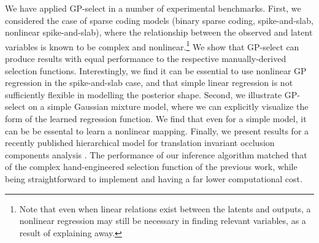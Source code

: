 We have applied GP-select in a number of experimental benchmarks.
First, we considered the case of sparse coding models (binary sparse coding,
spike-and-slab, nonlinear spike-and-slab), where the relationship between the
observed and latent variables is known to be complex and nonlinear.\footnote{Note that
 even when linear relations exist between the latents and outputs, a nonlinear
regression may still be necessary in finding relevant variables,
as a result of explaining away.}
%
We show that GP-select can produce results with equal performance to the respective manually-derived selection functions.
%
Interestingly, we find it can be essential to use nonlinear GP regression
in the spike-and-slab case, and that simple linear regression is not
sufficiently flexible in modelling the posterior shape.
%
Second, we illustrate GP-select on a simple Gaussian mixture model,
where we can explicitly visualize the form of the learned regression function.
We find that even for a simple model, it can be be essental to learn a nonlinear mapping.
%
Finally, we present results
for a recently published hierarchical model for  translation invariant occlusion components analysis
\citep{DaiLucke2014}.
The performance of our inference algorithm matched that of the complex
hand-engineered selection function of the previous work, while being straightforward
to implement and having a far lower computational cost.



